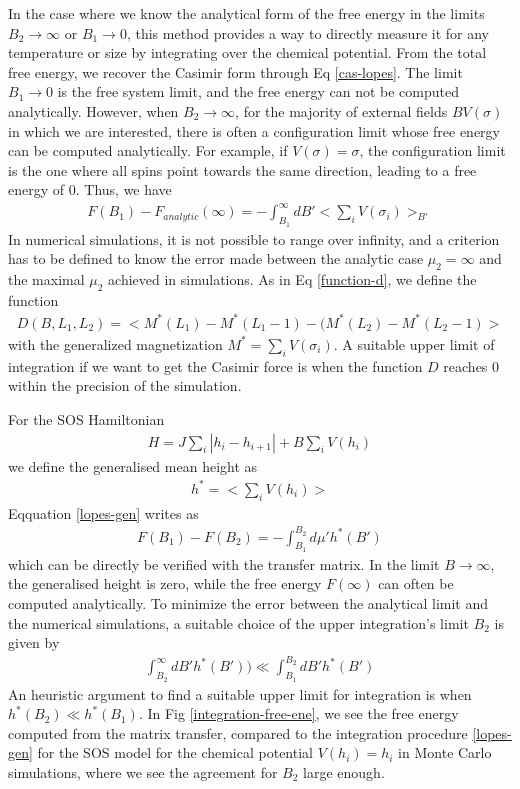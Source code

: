 In the case where we know the analytical form of the free energy in the limits $B_2 \to \infty$ or $B_1 \to 0$, this method provides a way to directly measure it for any temperature or size by integrating over the chemical potential.
From the total free energy, we recover the Casimir form through Eq \eqref{cas-lopes}.
The limit $B_1 \to 0$ is the free system limit, and the free energy can not be computed analytically. However, when $B_2 \to \infty$, for  the majority of external fields $B V(\sigma)$ in which we are interested, there is often a configuration limit whose free energy can be computed analytically. For example, if $V(\sigma)=\sigma$, the configuration limit is the one where all spins point towards the same direction, leading to a free energy of $0$. Thus, we have
\begin{align}
   F(B_1) - F_{analytic}(\infty) = - \int_{B_1}^{\infty} d B'  < \sum_i V(\sigma_i) >_{B'} 
   \label{lopes-gen}
\end{align}
In numerical simulations, it is not possible to range over infinity, and a criterion has to be defined to know the error made between the analytic case $\mu_2 = \infty$ and the maximal $\mu_2$ achieved in simulations. As in Eq \eqref{function-d}, we define the function
\begin{align}
    D(B,L_1,L_2) =  < M^\ast(L_1)-M^\ast(L_1-1) - (M^\ast(L_2)-M^\ast(L_2-1) >
\end{align}
with the generalized magnetization $M^\ast = \sum_i V(\sigma_i)$. A suitable upper limit of integration if we want to get the Casimir force is when the function $D$ reaches $0$ within the precision of the simulation.


For the SOS Hamiltonian
\begin{align}
    H =  J \sum_i |h_i -h_{i+1}|  + B \sum_i V(h_i)
\end{align}
we define the generalised mean height as
\begin{align}
    h^\ast = < \sum_i V(h_i) >
\end{align}
Eqquation \eqref{lopes-gen} writes as
\begin{align}
   F(B_1) - F(B_2) = -  \int_{B_1}^{B_2} d\mu' h^\ast(B')
   \label{diff-gene}
\end{align}
which can be directly be verified with the transfer matrix. 
In the limit $B \to \infty$, the generalised height is zero, while the free energy $F(\infty)$ can often be computed analytically. 
To minimize the error between the analytical limit and the numerical simulations, a suitable choice of the upper integration's limit $B_2$ is given by
\begin{align}
    \int_{B_2}^\infty  d B' h^\ast(B')) \ll \int_{B_1}^{B_2}  dB' h^\ast(B')
\end{align}
An heuristic argument to find a suitable upper limit for integration is when $h^\ast(B_2) \ll h^\ast(B_1)$.
In Fig \ref{integration-free-ene}, we see the free energy computed from the matrix transfer, compared to the integration procedure \eqref{lopes-gen} for the SOS model for the chemical potential $V(h_i)=h_i$ in Monte Carlo simulations, where we see the agreement for $B_2$ large enough.


